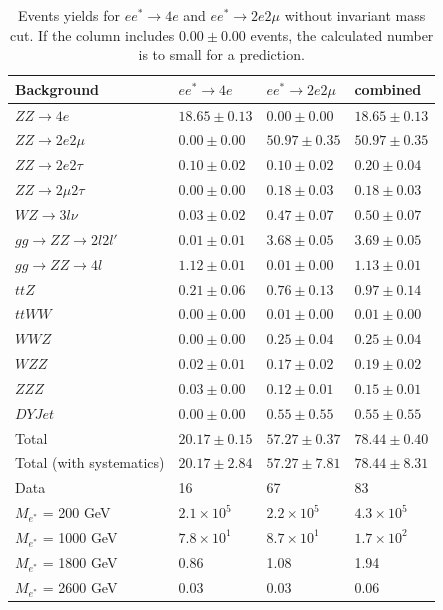 \begin{table}[h!]
\begin{center}
\begin{tabular}{|l|l|l|l|}
\hline 
Background & $e e^{*}\rightarrow 4e$ & $e e^{*}\rightarrow 2e 2\mu$ & combined \\ 
\hline
$ZZ \rightarrow 4e$ & $18.65\pm 0.13$ & $0.00\pm 0.00$ & $18.65\pm 0.13$\\
$ZZ \rightarrow 2e 2\mu$ & $0.00\pm 0.00$ & $50.97\pm 0.35$ & $50.97\pm 0.35$\\
$ZZ \rightarrow 2e 2\tau$ & $0.10\pm 0.02$ & $0.10\pm 0.02$ & $0.20\pm 0.04$\\
$ZZ \rightarrow 2\mu 2\tau$ & $0.00\pm 0.00$ & $0.18\pm 0.03$ & $0.18\pm 0.03$\\
$WZ \rightarrow 3l \nu$ & $0.03\pm 0.02$ & $0.47\pm 0.07$ & $0.50\pm 0.07$ \\
$gg \rightarrow ZZ \rightarrow 2l2l'$ & $0.01\pm 0.01$ & $3.68\pm 0.05$ & $3.69\pm 0.05$ \\
$gg \rightarrow ZZ \rightarrow 4l$ & $1.12\pm 0.01$ & $0.01\pm 0.00$ & $1.13\pm 0.01$\\
$ttZ$ & $0.21\pm 0.06$ & $0.76\pm 0.13$ & $0.97\pm 0.14$\\
$ttWW$ & $0.00\pm 0.00$ & $0.01\pm 0.00$ & $0.01\pm 0.00$\\
$WWZ$ & $0.00\pm 0.00$ & $0.25\pm 0.04$ & $0.25\pm 0.04$\\
$WZZ$ & $0.02\pm 0.01$ & $0.17\pm 0.02$ & $0.19\pm 0.02$\\
$ZZZ$ & $0.03\pm 0.00$ & $0.12\pm 0.01$ & $0.15\pm 0.01$\\
$DYJet$ & $0.00\pm 0.00$ & $0.55\pm 0.55$ & $0.55\pm 0.55$\\
\hline
Total & $20.17\pm 0.15$ & $57.27\pm 0.37$ & $78.44\pm 0.40$\\
Total (with systematics) & $20.17\pm 2.84$ & $57.27\pm 7.81$ & $78.44\pm 8.31$ \\
\hline
\hline
Data & 16 & 67 & 83\\
\hline
\hline
$M_{e^{*}}$ = 200 GeV & $2.1 \times 10^{5}$  & $2.2 \times 10^{5}$ & $4.3 \times 10^{5}$\\
$M_{e^{*}}$ = 1000 GeV & $7.8 \times 10^{1}$ & $8.7 \times 10^{1}$ & $1.7 \times 10^{2}$\\
$M_{e^{*}}$ = 1800 GeV & 0.86 & 1.08 & 1.94\\
$M_{e^{*}}$ = 2600 GeV & 0.03 & 0.03 & 0.06\\
\hline
\end{tabular}
\end{center}
\caption{\label{tab:yieldsestar}Events yields for $e e^{*}\rightarrow 4e$ and $e e^{*}\rightarrow 2e 2\mu$ without invariant mass cut. If the column includes $0.00 \pm 0.00$ events, the calculated number is to small for a prediction.}
\end{table}


